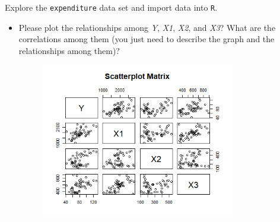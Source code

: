 \documentclass[12pt,letterpaper]{article}
\begin{document}
\vspace{.5cm}
\noindent Explore the \texttt{expenditure} data set and import data into \texttt{R}.
\vspace{.5cm}
  
\vspace{.5cm}
\begin{itemize}

\item
Please plot the relationships among \emph{Y}, \emph{X1}, \emph{X2}, and \emph{X3}? What are the correlations among them (you just need to describe the graph and the relationships among them)?
\vspace{.5cm}
 
\begin{figure}[H]
	\centering
	\includegraphics[width=0.8\textwidth]{1}
\end{figure}


\end{itemize}
\end{document}
